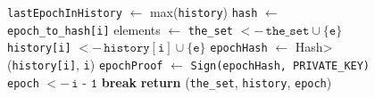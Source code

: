 \begin{figure}[t!]
\begin{adjustbox}{minipage=[t]{\columnwidth}}
\begin{algorithm}[H]
\begin{algorithmic}[1]
            		\State \texttt{lastEpochInHistory} $\leftarrow$ max(\texttt{history})
            			\State \texttt{hash} $\leftarrow$  \texttt{epoch\_to\_hash[i]}
                			\State elements $\leftarrow$ 
									\State \texttt{the\_set} \(<- \, \texttt{the\_set} \cup \{\texttt{e}\}\)
									\State  \texttt{history[i]} \(<- \, \texttt{history}[\texttt{i}] \cup \{\texttt{e}\}\)
                    	 		\EndIf
                    	 	\EndFor
                    	    \State \texttt{epochHash} $\leftarrow$ \<Hash>(\texttt{history[i]}, \texttt{i})
                			\State \texttt{epochProof} $\leftarrow$  \texttt{Sign(\texttt{epochHash}, PRIVATE\_KEY)}
               			\State {}
               		 \Else
						\State \texttt{epoch} \(<- \, \texttt{i - 1}\)
               		 	\State \textbf{break}
                    	\EndIf
                	\EndFor
            		\State \textbf{return} (\texttt{the\_set}, \texttt{history}, \texttt{epoch}) 
            	\EndFunction

        \end{algorithmic}
      \end{algorithm}
	\end{adjustbox}
  \end{figure}
  
